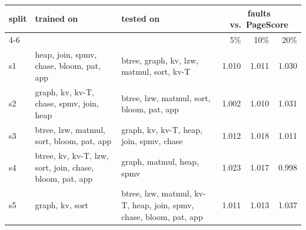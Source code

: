 \begin{tabular}{l>{\raggedright\arraybackslash}p{4.6cm}>{\raggedright\arraybackslash}p{5.0cm}rrr}
\toprule
split & trained on & tested on & \multicolumn{3}{c}{faults vs.\ PageScore} \\
\cmidrule(l){4-6}
 & & & 5\% & 10\% & 20\% \\
\midrule
s1 & heap, join, spmv, chase, bloom, pat, app & btree, graph, kv, lzw, matmul, sort, kv-T & 1.010 & 1.011 & 1.030 \\
s2 & graph, kv, kv-T, chase, spmv, join, heap & btree, lzw, matmul, sort, bloom, pat, app & 1.002 & 1.010 & 1.031 \\
s3 & btree, lzw, matmul, sort, bloom, pat, app & graph, kv, kv-T, heap, join, spmv, chase & 1.012 & 1.018 & 1.011 \\
s4 & btree, kv, kv-T, lzw, sort, join, chase, bloom, pat, app & graph, matmul, heap, spmv & 1.023 & 1.017 & 0.998 \\
s5 & graph, kv, sort & btree, lzw, matmul, kv-T, heap, join, spmv, chase, bloom, pat, app & 1.011 & 1.013 & 1.037 \\
\bottomrule
\end{tabular}
